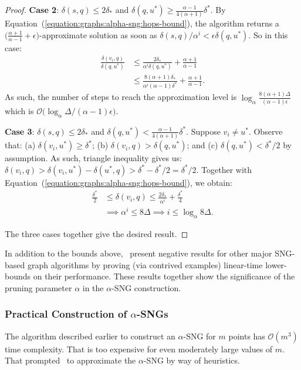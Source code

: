 \begin{proof}
    \textbf{Case 2}: $\delta(s, q) \leq 2 \delta_\ast$ and $\delta(q, u^\ast) \geq \frac{\alpha - 1}{4(\alpha + 1)}\delta^\ast$. By Equation~(\ref{equation:graphs:alpha-sng:hops-bound}), the algorithm returns a
    $\big( \frac{\alpha + 1}{\alpha - 1} + \epsilon \big)$-approximate solution as soon as $\delta(s, q)/\alpha^i < \epsilon \delta(q, u^\ast)$. So in this case:
    \begin{align*}
        \frac{\delta(v_i, q)}{\delta(q, u^\ast)} &\leq \frac{2 \delta_\ast}{\alpha^i \delta(q, u^\ast)} + \frac{\alpha + 1}{\alpha - 1} \\
        &\leq \frac{8 (\alpha + 1) \delta_\ast}{\alpha^i (\alpha - 1) \delta^\ast} + \frac{\alpha + 1}{\alpha - 1}.
    \end{align*}
    As such, the number of steps to reach the approximation level is $\log_\alpha \frac{8 (\alpha + 1) \Delta}{(\alpha - 1) \epsilon}$ which is $\mathcal{O}\big( \log_\alpha \Delta / (\alpha - 1) \epsilon \big)$.

    \textbf{Case 3}: $\delta(s, q) \leq 2 \delta_\ast$ and $\delta(q, u^\ast) < \frac{\alpha - 1}{4(\alpha + 1)}\delta^\ast$. Suppose $v_i \neq u^\ast$. Observe that: (a) $\delta(v_i, u^\ast) \geq \delta^\ast$;
    (b) $\delta(v_i, q) > \delta(q, u^\ast)$; and (c) $\delta(q, u^\ast) < \delta^\ast/2$ by assumption.
    As such, triangle inequality gives us: $\delta(v_i, q) > \delta(v_i, u^\ast) - \delta(u^\ast, q) >
    \delta^\ast - \delta^\ast/2 = \delta^\ast/2$. Together with Equation~(\ref{equation:graphs:alpha-sng:hops-bound}), we obtain:
    \begin{align*}
        \frac{\delta^\ast}{2} &\leq \delta(v_i, q) \leq \frac{2 \delta_\ast}{\alpha^i} + \frac{\delta^\ast}{4} \\
        &\implies \alpha^i \leq 8 \Delta \implies i \leq \log_\alpha 8\Delta.
    \end{align*}

    The three cases together give the desired result.
\end{proof}

In addition to the bounds above,~\cite{indyk2023worstcase} present negative results
for other major SNG-based graph algorithms by proving (via contrived examples)
linear-time lower-bounds on their performance. These results together show the
significance of the pruning parameter $\alpha$ in the $\alpha$-SNG construction.

\subsubsection{Practical Construction of $\alpha$-SNGs}
The algorithm described earlier to construct an $\alpha$-SNG for $m$ points
has $\mathcal{O}(m^3)$ time complexity. That is too expensive for even moderately
large values of $m$. That prompted~\cite{diskann} to approximate the $\alpha$-SNG
by way of heuristics.

